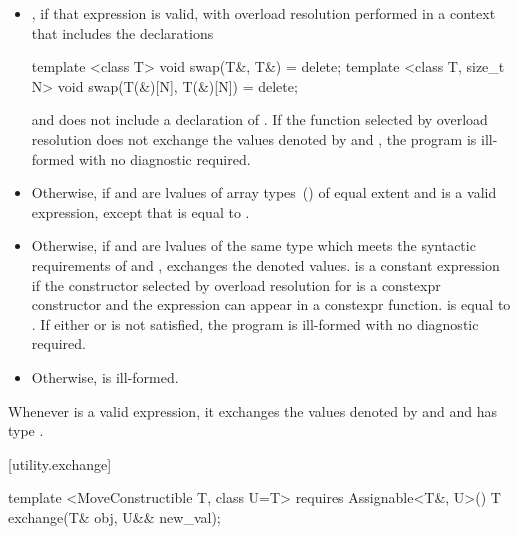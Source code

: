 \begin{itemize}
\item
  , if that expression is valid, with overload resolution
  performed in a context that includes the declarations
\begin{codeblock}
  template <class T>
  void swap(T&, T&) = delete;
  template <class T, size_t N>
  void swap(T(&)[N], T(&)[N]) = delete;
\end{codeblock}
  and does not include a declaration of .
  If the function selected by overload resolution does not
  exchange the values denoted by  and ,
  the program is ill-formed with no diagnostic required.

\item
  Otherwise,  if  and
   are lvalues of array types~()
  of equal extent and 
  is a valid expression, except that
   is equal to
  .

\item
  Otherwise, if  and  are lvalues of the
  same type  which meets the syntactic requirements of
   and
  , exchanges the denoted values.
   is a constant expression if
  the constructor selected by overload resolution for
   is a constexpr constructor and
  the expression  can appear in a
  constexpr function. 
  is equal to . If either
   or
   is not satisfied, the program
  is ill-formed with no diagnostic required.

\item
  Otherwise,  is ill-formed.
\end{itemize}

\pnum
\remark Whenever  is a valid
expression, it exchanges the values denoted by 
and  and has type .

[utility.exchange]{}

\begin{itemdecl}
template <MoveConstructible T, class U=T>
  requires Assignable<T&, U>()
T exchange(T& obj, U&& new_val);
\end{itemdecl}

